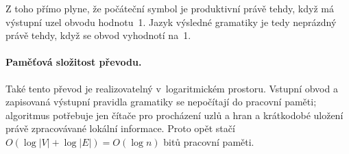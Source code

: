 Z toho přímo plyne, že počáteční symbol je produktivní právě tehdy, když má výstupní uzel obvodu hodnotu~1. Jazyk výsledné gramatiky je tedy neprázdný právě tehdy, když se obvod vyhodnotí na~1.

\paragraph{Paměťová složitost převodu.}
Také tento převod je realizovatelný v~logaritmickém prostoru. Vstupní obvod a zapisovaná výstupní pravidla gramatiky se nepočítají do pracovní paměti; algoritmus potřebuje jen čítače pro procházení uzlů a hran a krátkodobé uložení právě zpracovávané lokální informace. Proto opět stačí $O(\log |V| + \log |E|)=O(\log n)$ bitů pracovní paměti.
